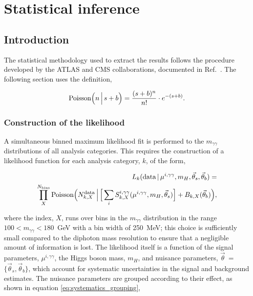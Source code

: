 \chapter{Statistical inference}
\label{chap:hgg_stats}

\section{Introduction}
The statistical methodology used to extract the results follows the procedure developed by the ATLAS and CMS collaborations, documented in Ref.~\cite{Khachatryan:2014jba}. The following section uses the definition,

\begin{equation}\label{eq:poisson_def}
    {\rm{Poisson}}\Big(n\,\Big|\,s+b\Big) = \frac{(s+b)^n}{n!} \cdot e^{-(s+b)}.
\end{equation}

\subsection{Construction of the likelihood}\label{sec:category_likelihood}
A simultaneous binned maximum likelihood fit is performed to the $m_{\gamma\gamma}$ distributions of all analysis categories. This requires the construction of a likelihood function for each analysis category, $k$, of the form,

\begin{equation}\label{eq:category_likelihood}
\begin{split}
    L_k({\rm{data}}\,|\,\mu^{i,\gamma\gamma},m_H,\vec{\theta}_s,\vec{\theta}_b) = \\
    \prod^{N_{\rm{bins}}}_{X} {\rm{Poisson}} \Big( N_{k,X}^{\rm{data}} \, \Big| \, \Big[ \sum_{i} S_{k,X}^{i,\gamma\gamma}(\mu^{i,\gamma\gamma},m_H,\vec{\theta}_s)\Big] + B_{k,X}(\vec{\theta}_b) \Big),        
\end{split}
\end{equation}


\noindent
where the index, $X$, runs over bins in the $m_{\gamma\gamma}$ distribution in the range $100<m_{\gamma\gamma}<180$~GeV with a bin width of 250~MeV; this choice is sufficiently small compared to the diphoton mass resolution to ensure that a negligible amount of information is lost. The likelihood itself is a function of the signal parameters, $\mu^{i,\gamma\gamma}$, the Higgs boson mass, $m_H$, and nuisance parameters, $\vec{\theta}$~=~$\{\vec{\theta}_s,\vec{\theta}_b\}$, which account for systematic uncertainties in the signal and background estimates. The nuisance parameters are grouped according to their effect, as shown in equation \ref{eq:systematics_grouping},

